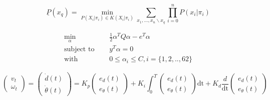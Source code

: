 \documentclass[a4paper, 12pt]{article}
\begin{document}
\begin{sloppypar}





\begin{equation}
    \label{lowbound}
    \underline{P}(x_q) = \min_{P(X_i|\pi_i) \in K(X_i|\pi_i)} \sum_{x_1,...,x_n \backslash x_q} \prod_{i=0}^n P(x_i|\pi_i)
\end{equation}

\begin{equation}
    \label{Chap3:Eq2}
    \begin{split}
        \min_{\alpha}\quad & \frac{1}{2}{\alpha}^{T}Q \alpha - e^T\alpha \\
        \text{subject to } \quad & y^T \alpha = 0 \\
        \text{with } \quad &  0 \leq {\alpha}_i \leq C, i = \{ 1,2,..,62\}
    \end{split}
\end{equation}

\begin{equation} \renewcommand{\arraystretch}{1.8}
    \label{Chap3:Eq4}
    \begin{pmatrix}
        v_t \\ \omega_{t}
    \end{pmatrix}=
    \begin{pmatrix}
        \dot{d}(t) \\ \dot{\theta} (t)
    \end{pmatrix}= K_p \begin{pmatrix}
        e_d (t) \\e_{\theta} (t)
    \end{pmatrix} + K_i \int_{0}^{T} \begin{pmatrix}
        e_d (t) \\e_{\theta} (t)
    \end{pmatrix} \mathrm{dt} + K_d \frac{d}{\mathrm{dt}} \begin{pmatrix}
        e_d (t) \\e_{\theta} (t)
    \end{pmatrix}
\end{equation}


\end{sloppypar}
\end{document}
